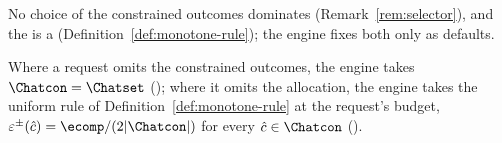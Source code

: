 
No choice of the constrained outcomes dominates (Remark~\ref{rem:selector}),
and the  is a 
(Definition~\ref{def:monotone-rule}); the engine fixes both only as defaults.

\begin{requirement}\label{req:request-defaults}
Where a request omits the constrained outcomes, the engine takes
$\Chatcon=\Chatset$ (); where it omits the
allocation, the engine takes the uniform rule of
Definition~\ref{def:monotone-rule} at the request's budget,
$\varepsilon^{\pm}(\hat c)=\ecomp/(2|\Chatcon|)$ for every
$\hat c\in\Chatcon$ ().
\end{requirement}
